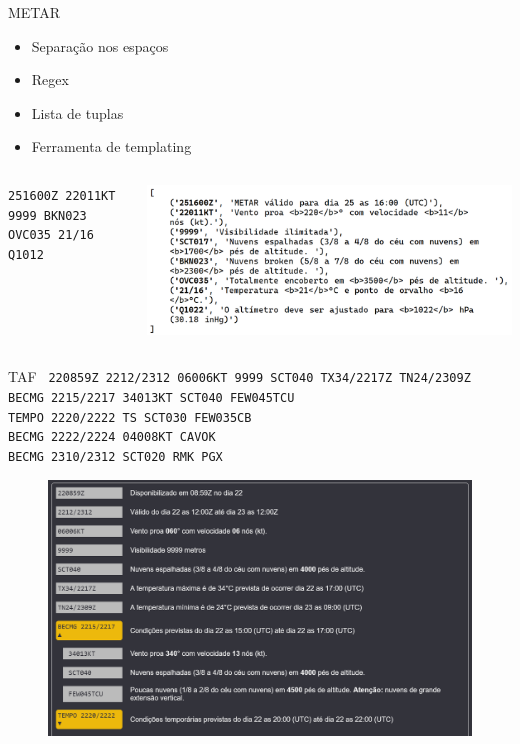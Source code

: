 \documentclass{beamer}
\begin{document}
\begin{frame}{METAR}
    \centering
    \begin{itemize}
        \item Separação nos espaços
        \item Regex
        \item Lista de tuplas
        \item Ferramenta de templating
    \end{itemize}

    \begin{minipage}[b]{0.9\linewidth}
        \begin{columns}
            \begin{column}{0.4\textwidth}
                \tiny{\texttt{251600Z 22011KT 9999 BKN023 OVC035 21/16 Q1012}}
            \end{column}
            \begin{column}{0.6\textwidth}
                \includegraphics[width=\linewidth]{img/metar-dec.png}
            \end{column}
        \end{columns}
    \end{minipage}
\end{frame}

\begin{frame}{TAF}
    \footnotesize{\texttt{
220859Z 2212/2312 06006KT 9999 SCT040 TX34/2217Z TN24/2309Z \\
    BECMG 2215/2217 34013KT SCT040 FEW045TCU \\
    TEMPO 2220/2222 TS SCT030 FEW035CB \\
    BECMG 2222/2224 04008KT CAVOK \\
    BECMG 2310/2312 SCT020 RMK PGX}}

  \begin{figure}[ht]
    \begin{center}
    \includegraphics[width=0.65\linewidth]{img/TAF-SBBE.png}
    \label{fig:UI}
    \end{center}
    \end{figure}
\end{frame}
\end{document}
